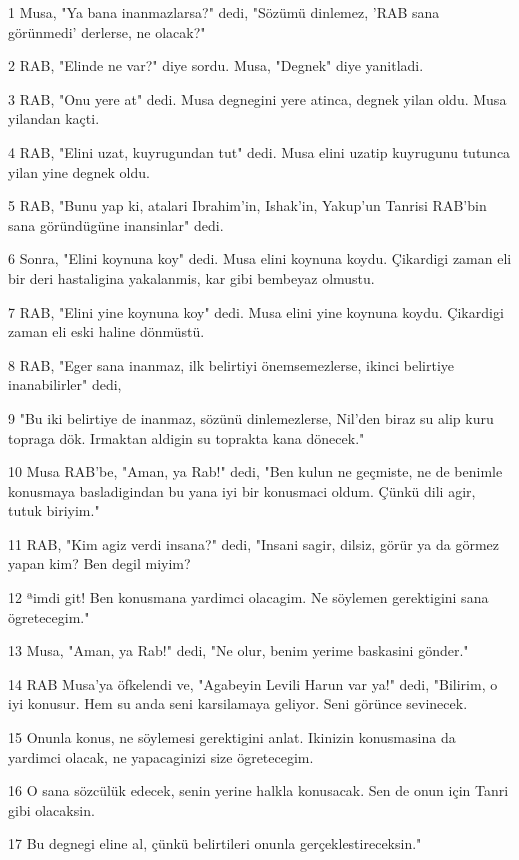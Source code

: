\par 1 Musa, "Ya bana inanmazlarsa?" dedi, "Sözümü dinlemez, 'RAB sana görünmedi' derlerse, ne olacak?"
\par 2 RAB, "Elinde ne var?" diye sordu. Musa, "Degnek" diye yanitladi.
\par 3 RAB, "Onu yere at" dedi. Musa degnegini yere atinca, degnek yilan oldu. Musa yilandan kaçti.
\par 4 RAB, "Elini uzat, kuyrugundan tut" dedi. Musa elini uzatip kuyrugunu tutunca yilan yine degnek oldu.
\par 5 RAB, "Bunu yap ki, atalari Ibrahim'in, Ishak'in, Yakup'un Tanrisi RAB'bin sana göründügüne inansinlar" dedi.
\par 6 Sonra, "Elini koynuna koy" dedi. Musa elini koynuna koydu. Çikardigi zaman eli bir deri hastaligina yakalanmis, kar gibi bembeyaz olmustu.
\par 7 RAB, "Elini yine koynuna koy" dedi. Musa elini yine koynuna koydu. Çikardigi zaman eli eski haline dönmüstü.
\par 8 RAB, "Eger sana inanmaz, ilk belirtiyi önemsemezlerse, ikinci belirtiye inanabilirler" dedi,
\par 9 "Bu iki belirtiye de inanmaz, sözünü dinlemezlerse, Nil'den biraz su alip kuru topraga dök. Irmaktan aldigin su toprakta kana dönecek."
\par 10 Musa RAB'be, "Aman, ya Rab!" dedi, "Ben kulun ne geçmiste, ne de benimle konusmaya basladigindan bu yana iyi bir konusmaci oldum. Çünkü dili agir, tutuk biriyim."
\par 11 RAB, "Kim agiz verdi insana?" dedi, "Insani sagir, dilsiz, görür ya da görmez yapan kim? Ben degil miyim?
\par 12 ªimdi git! Ben konusmana yardimci olacagim. Ne söylemen gerektigini sana ögretecegim."
\par 13 Musa, "Aman, ya Rab!" dedi, "Ne olur, benim yerime baskasini gönder."
\par 14 RAB Musa'ya öfkelendi ve, "Agabeyin Levili Harun var ya!" dedi, "Bilirim, o iyi konusur. Hem su anda seni karsilamaya geliyor. Seni görünce sevinecek.
\par 15 Onunla konus, ne söylemesi gerektigini anlat. Ikinizin konusmasina da yardimci olacak, ne yapacaginizi size ögretecegim.
\par 16 O sana sözcülük edecek, senin yerine halkla konusacak. Sen de onun için Tanri gibi olacaksin.
\par 17 Bu degnegi eline al, çünkü belirtileri onunla gerçeklestireceksin."
